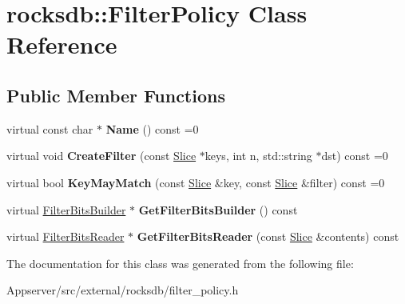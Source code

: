 \hypertarget{classrocksdb_1_1FilterPolicy}{}\section{rocksdb\+:\+:Filter\+Policy Class Reference}
\label{classrocksdb_1_1FilterPolicy}
\subsection*{Public Member Functions}
\begin{DoxyCompactItemize}
\item 
virtual const char $\ast$ {\bfseries Name} () const =0\hypertarget{classrocksdb_1_1FilterPolicy_a51521763e767376e3325e5565a6f7bf6}{}\label{classrocksdb_1_1FilterPolicy_a51521763e767376e3325e5565a6f7bf6}

\item 
virtual void {\bfseries Create\+Filter} (const \hyperlink{classrocksdb_1_1Slice}{Slice} $\ast$keys, int n, std\+::string $\ast$dst) const =0\hypertarget{classrocksdb_1_1FilterPolicy_ad43c700719f38ca4ef864ffb3ec73f5e}{}\label{classrocksdb_1_1FilterPolicy_ad43c700719f38ca4ef864ffb3ec73f5e}

\item 
virtual bool {\bfseries Key\+May\+Match} (const \hyperlink{classrocksdb_1_1Slice}{Slice} \&key, const \hyperlink{classrocksdb_1_1Slice}{Slice} \&filter) const =0\hypertarget{classrocksdb_1_1FilterPolicy_afd9296968a61335cc7e1eb5ae6f85489}{}\label{classrocksdb_1_1FilterPolicy_afd9296968a61335cc7e1eb5ae6f85489}

\item 
virtual \hyperlink{classrocksdb_1_1FilterBitsBuilder}{Filter\+Bits\+Builder} $\ast$ {\bfseries Get\+Filter\+Bits\+Builder} () const\hypertarget{classrocksdb_1_1FilterPolicy_a267639ad348889203f98af1fc60286d7}{}\label{classrocksdb_1_1FilterPolicy_a267639ad348889203f98af1fc60286d7}

\item 
virtual \hyperlink{classrocksdb_1_1FilterBitsReader}{Filter\+Bits\+Reader} $\ast$ {\bfseries Get\+Filter\+Bits\+Reader} (const \hyperlink{classrocksdb_1_1Slice}{Slice} \&contents) const\hypertarget{classrocksdb_1_1FilterPolicy_abb583d453b4e3d158d0f329e7724a15e}{}\label{classrocksdb_1_1FilterPolicy_abb583d453b4e3d158d0f329e7724a15e}

\end{DoxyCompactItemize}


The documentation for this class was generated from the following file\+:\begin{DoxyCompactItemize}
\item 
Appserver/src/external/rocksdb/filter\+\_\+policy.\+h\end{DoxyCompactItemize}

